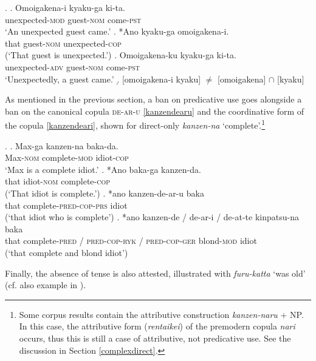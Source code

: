 \ex. \ag. Omoigakena-i kyaku-ga ki-ta.\\
unexpected-\textsc{mod} guest-\textsc{nom} come-\textsc{pst}\\
`An unexpected guest came.' \null \hfill \citep[67]{yamakido:2005:nature}
\bg. *Ano kyaku-ga omoigakena-i.\\
that guest-\textsc{nom} unexpected-\textsc{cop}\\
(`That guest is unexpected.’)
\cg. Omoigakena-ku kyaku-ga ki-ta.\\
unexpected-\textsc{adv} guest-\textsc{nom} come-\textsc{pst}\\
`Unexpectedly, a guest came.'
\d. [omoigakena-i kyaku] $\neq$ [omoigakena] $\cap$ [kyaku]

As mentioned in the previous section, a ban on predicative use goes alongside a ban on the canonical copula \textsc{de-ar-u} \ref{kanzendearu} \citep[108--109]{ayano:2010:revisiting} and the coordinative form of the copula \ref{kanzendeari}, shown for direct-only \textit{kanzen-na} `complete’.\footnote{Some corpus results contain the attributive construction \textit{kanzen-naru} + NP. In this case, the attributive form (\textit{rentaikei}) of the premodern copula \textit{nari} occurs, thus this is still a case of attributive, not predicative use. See the discussion in Section \ref{complexdirect}.}

\ex. \ag. Max-ga kanzen-na baka-da.\\
Max-\textsc{nom} complete-\textsc{mod} idiot-\textsc{cop}\\
`Max is a complete idiot.' \null \hfill \citep[68]{yamakido:2005:nature}
\bg. *Ano baka-ga kanzen-da.\\
that idiot-\textsc{nom} complete-\textsc{cop}\\
(`That idiot is complete.’)
\cg. *ano kanzen-de-ar-u baka\\
that complete-\textsc{pred-cop-prs} idiot \label{kanzendearu}\\
(`that idiot who is complete’)
\dg. *ano kanzen-de / de-ar-i / de-at-te kinpatsu-na baka\\
that complete-\textsc{pred} / \textsc{pred-cop-ryk} / \textsc{pred-cop-ger} blond-\textsc{mod} idiot \label{kanzendeari}\\
(`that complete and blond idiot’)

Finally, the absence of tense is also attested, illustrated with \textit{furu-katta} `was old' (cf. also example in \citealt[109]{ayano:2010:revisiting}).

